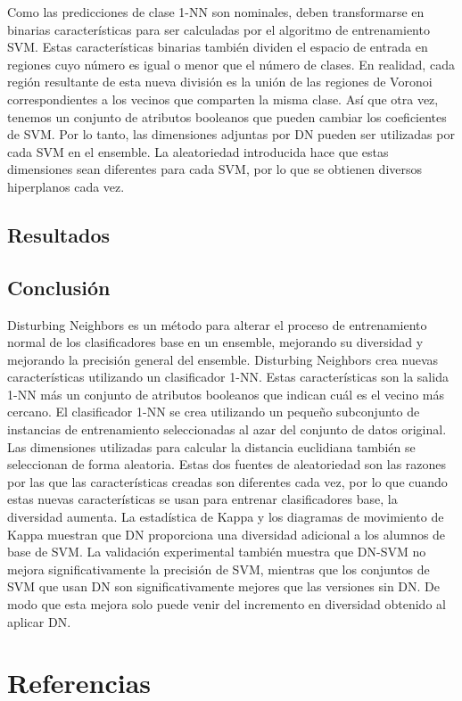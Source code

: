 Como las predicciones de clase 1-NN son nominales, deben transformarse en binarias
características para ser calculadas por el algoritmo de entrenamiento SVM. Estas características binarias también dividen el espacio de entrada en regiones cuyo número es igual o menor que el número de clases. En realidad, cada región resultante de esta nueva división es la unión de las regiones de Voronoi correspondientes a los vecinos que comparten la misma clase. Así que otra vez, tenemos un conjunto de atributos booleanos que pueden cambiar los coeficientes de SVM.
Por lo tanto, las dimensiones adjuntas por DN pueden ser utilizadas por cada SVM en el ensemble. La aleatoriedad introducida hace que estas dimensiones sean diferentes para cada SVM, por lo que se obtienen diversos hiperplanos cada vez.
\subsection{Resultados}
\subsection{Conclusión}
Disturbing Neighbors es un método para alterar el proceso de entrenamiento normal de los clasificadores base en un ensemble, mejorando su diversidad y mejorando la precisión general del ensemble. Disturbing Neighbors crea nuevas características utilizando un clasificador 1-NN. Estas características son la salida 1-NN más un conjunto de atributos booleanos que indican cuál es el vecino más cercano. El clasificador 1-NN se crea utilizando un pequeño subconjunto de instancias de entrenamiento seleccionadas al azar del conjunto de datos original. Las dimensiones utilizadas para calcular la distancia euclidiana también se seleccionan de forma aleatoria. Estas dos fuentes de aleatoriedad son las razones por las que las características creadas son diferentes cada vez, por lo que cuando estas nuevas características se usan para entrenar clasificadores base, la diversidad aumenta.
La estadística de Kappa y los diagramas de movimiento de Kappa muestran que DN proporciona una diversidad adicional a los alumnos de base de SVM. La validación experimental también muestra que DN-SVM no mejora significativamente la precisión de SVM, mientras que los conjuntos de SVM que usan DN son significativamente mejores que las versiones sin DN. De modo que esta mejora solo puede venir del incremento en diversidad obtenido al aplicar DN.

\section{Referencias}

